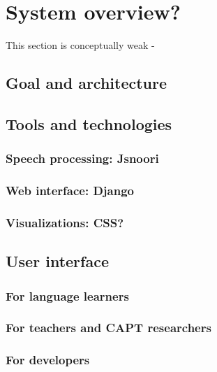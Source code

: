 \chapter{System overview?}
\label{chap:system}
This section is conceptually weak - 

\section{Goal and architecture}
\label{sec:system:goal}

\section{Tools and technologies}
\label{sec:system:tools}
\subsection{Speech processing: Jsnoori}
\subsection{Web interface: Django} %
\subsection{Visualizations: CSS?}

\section{User interface}
\label{sec:system:interface}
\subsection{For language learners}
\subsection{For teachers and CAPT researchers}
\subsection{For developers}